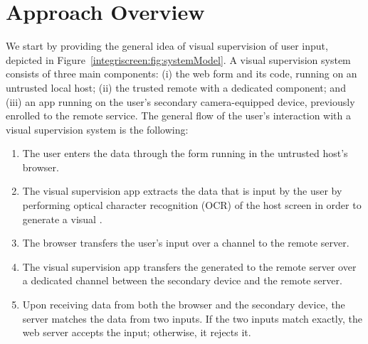 \section{Approach Overview}
\label{untegriscreen:sec:systemDesign}





We start by providing the general idea of visual supervision of user input, depicted in Figure~\ref{integriscreen:fig:systemModel}.
A visual supervision system consists of three main components: (i) the web form and its code, running on an untrusted local host; (ii) the trusted remote \server with a dedicated component; and (iii) an app running on the user's secondary camera-equipped device, previously enrolled to the remote service. The general flow of the user's interaction with a visual supervision system is the following:

\begin{enumerate}
  \item[\one] The user enters the data through the form running in the untrusted host's browser.

  \item[\two] The visual supervision app extracts the data that is input by the user by performing optical character recognition (OCR) of the host screen in order to generate a visual \textit{\POI}.

  \item[\three] The browser transfers the user's input over a \https channel to the remote server.

  \item[\four] The visual supervision app transfers the generated \POI to the remote server over a dedicated \tls channel between the secondary device and the remote server.

  \item[\five] Upon receiving data from both the browser and the secondary device, the server matches the data from two inputs.
  If the two inputs match exactly, the web server accepts the input; otherwise, it rejects it.
\end{enumerate}


